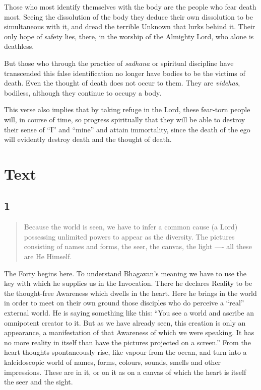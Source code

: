 \documentclass[12pt]{report}
\begin{document}
Those who most identify themselves with the body are the people who
fear death most. Seeing the dissolution of the body they deduce their
own dissolution to be simultaneous with it, and dread the terrible
Unknown that lurks behind it. Their only hope of safety lies, there,
in the worship of the Almighty Lord, who alone is deathless.

But those who through the practice of \emph{sadhana} or spiritual
discipline have transcended this false identification no longer have
bodies to be the victims of death. Even the thought of death does not
occur to them. They are \emph{videhas}, bodiless, although they
continue to occupy a body.

This verse also implies that by taking refuge in the Lord, these
fear-torn people will, in course of time, so progress spiritually that
they will be able to destroy their sense of ``I'' and ``mine'' and
attain immortality, since the death of the ego will evidently destroy
death and the thought of death.

\chapter{Text}


\section*{1}

\begin{quote}
Because the world is seen, we have to infer a common cause (a Lord)
possessing unlimited powers to appear as the diversity. The pictures
consisting of names and forms, the seer, the canvas, the light ----
all these are He Himself.
\end{quote}


The Forty begins here. To understand Bhagavan's meaning we have to use
the key with which he supplies us in the Invocation. There he declares
Reality to be the thought-free Awareness which dwells in the
heart. Here he brings in the world in order to meet on their own
ground those disciples who do perceive a ``real'' external world. He
is saying something like this: ``You see a world and ascribe an
omnipotent creator to it. But as we have already seen, this creation
is only an appearance, a manifestation of that Awareness of which we
were speaking. It has no more reality in itself than have the pictures
projected on a screen.'' From the heart thoughts spontaneously rise,
like vapour from the ocean, and turn into a kaleidoscopic world of
names, forms, colours, sounds, smells and other impressions. These are
in it, or on it as on a canvas of which the heart is itself the seer
and the sight.
\end{document}
